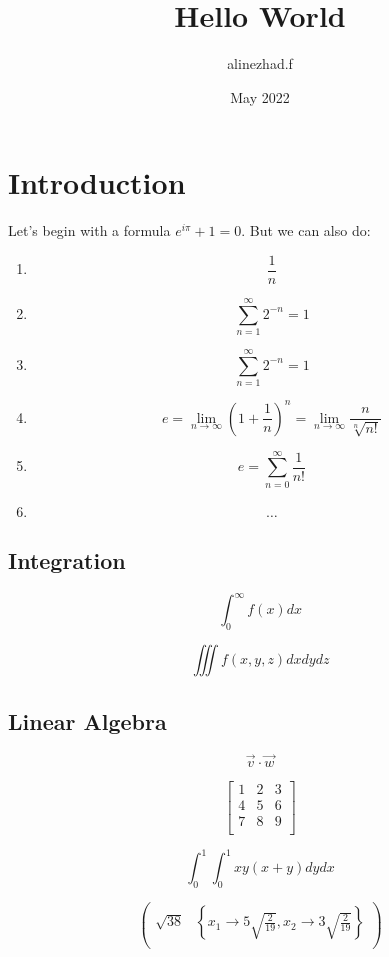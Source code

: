 \documentclass{article}
\title{Hello World}
\author{alinezhad.f }
\date{May 2022}
\numberwithin{table}{section}
\numberwithin{equation}{section}
\numberwithin{figure}{section}
\numberwithin{theorem}{section}
\begin{document}
\maketitle

\section{Introduction}

Let's begin with a formula $e^{i\pi}+1=0$. But we can also do:

\begin{enumerate}

\item $$ \frac{1}{n} $$

\item\[ \sum_{n=1}^{\infty}2^{-n}=1 \]

\item$$\sum_{n=1}^{\infty}2^{-n}=1$$

\item$$ e = \lim_{n\to\infty} \left(1+\frac{1}{n}\right)^n = 
\lim_{n\to\infty} \frac{n}{\sqrt[n]{n!}}
$$

\item$$e=\sum_{n=0}^{\infty} \frac{1}{n!}$$

\item$$\dots$$

\end{enumerate}


\subsection{Integration}

$$
\int_0^\infty f(x)dx
$$

$$
\iiint f(x,y,z) dx dy dz
$$

\subsection{Linear Algebra}

$$
\Vec{v}\cdot\Vec{w}
$$

$$
\begin{bmatrix}
1 & 2 & 3\\
4 & 5 & 6\\
7 & 8 & 9\\
\end{bmatrix}
$$

$$
\int _0^1\int _0^1 x y (x+y)dydx
$$

$$
\left(
\begin{array}{cc}
 \sqrt{38} & \left\{x_1\to 5 \sqrt{\frac{2}{19}},x_2\to 3 \sqrt{\frac{2}{19}}\right\} \\
\end{array}
\right)
$$
\end{document}
